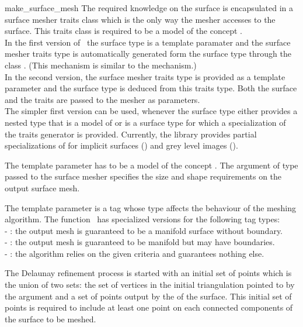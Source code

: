 \begin{ccRefFunction}{make_surface_mesh}
The required knowledge on the surface is encapsulated in
a surface mesher traits class  which is the only way the mesher
 accesses to the surface. This traits class is required to be a model
of the concept . \\
In the first  version
of  \ccRefName\, the surface type is a template paramater 
and the surface mesher traits type 
is  automatically generated form the surface type  through
the class 
.
(This mechanism is similar to the 
  mechanism.) \\
In the second version, the surface mesher traits type is provided
as a template parameter 
and the surface type is deduced from this traits type.
Both the surface and the traits 
are passed to the mesher as parameters. \\
The simpler first version can be used,
whenever the surface type either provides  a nested type
that is  a model of 
or is a surface type for which a specialization
of the traits generator 
is provided.
Currently, the library provides partial specializations
of  
for implicit surfaces () and 
grey level images ().
 


The template parameter  has to be a model
of the concept .
The argument of type   passed to the surface
mesher specifies the size and shape  requirements
on the output surface mesh.

The template parameter 
is a tag whose type affects the behaviour of the
meshing algorithm. The function \ccRefName\  has specialized versions
for the following  tag types: \\
- : the output mesh is guaranteed to be a manifold
surface without boundary.\\
- : the output mesh is guaranteed to be
manifold but may have boundaries.\\
- : the algorithm relies on the given criteria and
guarantees nothing else.



The Delaunay refinement
process is started with an initial set of points which is the union 
of two sets: the
set of vertices in the initial  triangulation pointed to by the
 argument   and a set of
points output by the  
of the surface.
This initial set of points is required to include at least one point
on each connected components of the surface to be meshed.




\end{ccRefFunction}

